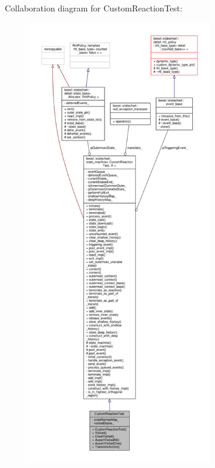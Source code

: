 Collaboration diagram for Custom\+Reaction\+Test\+:
\nopagebreak
\begin{figure}[H]
\begin{center}
\leavevmode
\includegraphics[height=550pt]{struct_custom_reaction_test__coll__graph}
\end{center}
\end{figure}
